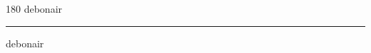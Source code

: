 
\begin{frame}
\begin{center}
\begin{turn}{180}
{\fontsize{2.5cm}{1em}\selectfont debonair}
\end{turn}
\vspace{1em}\par  
\hrule
\vspace{1em}\par  
{\fontsize{2.5cm}{1em}\selectfont debonair}
\end{center}
\end{frame}
